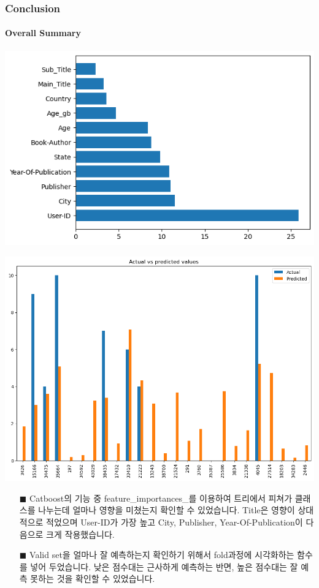 \documentclass{beamer}
\begin{document}
\begin{frame}
\frametitle{Conclusion}
\framesubtitle{Overall Summary}
\centering
\begin{minipage}{.5\textwidth}
  \centering
  \includegraphics[scale=0.35]{cat_boost importance.png}
\end{minipage}%
\begin{minipage}{.5\textwidth}
  \centering
  \includegraphics[scale=0.21]{sample pred vs actual.png}
\end{minipage}

\begin{itemize}
\item[$\blacksquare$] {\footnotesize Catboost의 기능 중 feature\_importances\_를 이용하여 트리에서 피쳐가 클래스를 나누는데 얼마나 영향을 미쳤는지 확인할 수 있었습니다. Title은 영향이 상대적으로 적었으며 User-ID가 가장 높고 City, Publisher, Year-Of-Publication이 다음으로 크게 작용했습니다.} 

\item[$\blacksquare$] {\footnotesize Valid set을 얼마나 잘 예측하는지 확인하기 위해서 fold과정에 시각화하는 함수를 넣어 두었습니다. 낮은 점수대는 근사하게 예측하는 반면, 높은 점수대는 잘 예측 못하는 것을 확인할 수 있었습니다.} 
\end{itemize}

\end{frame}
\end{document}
